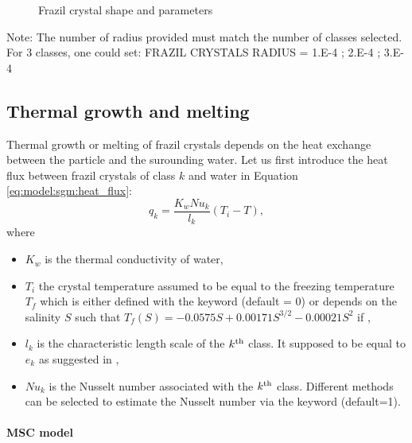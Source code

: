 \begin{figure}[H]
    \begin{center}
    \end{center}
    \caption{Frazil crystal shape and parameters}
    \label{fig:crystal_shape}
\end{figure}

\begin{WarningBlock}{Note:}
 The number of radius provided must match the number of classes selected. For 3 classes, one could set:
 FRAZIL CRYSTALS RADIUS = 1.E-4 ; 2.E-4 ; 3.E-4
\end{WarningBlock}

\subsection{Thermal growth and melting}
\label{section:thermal_growth}

Thermal growth or melting of frazil crystals depends on the heat exchange between the particle and the surounding water.
Let us first introduce the heat flux between frazil crystals of class $k$ and water in Equation \eqref{eq:model:sgm:heat_flux}:
\begin{equation}
q_k = \dfrac{K_w Nu_k}{l_k} (T_i - T),
\label{eq:model:sgm:heat_flux}
\end{equation}
where
\begin{itemize}
	\item $K_w$ is the thermal conductivity of water,
	\item $T_i$ the crystal temperature assumed to be equal to the freezing temperature $T_f$ which
is either defined with the keyword  (default = 0) or
depends on the salinity $S$ such that $T_f(S) = -0.0575S + 0.00171S^{3/2} - 0.00021S^2$ if ,
    \item $l_k$ is the characteristic length scale of the $k^{\rm{th}}$ class. It supposed to be equal to $e_k$ as suggested in \cite{jones_wells_2018},
    \item $Nu_k$ is the Nusselt number associated with the $k^{\rm{th}}$ class. Different methods can be selected to estimate the Nusselt number via the keyword  (default=1).
\end{itemize}


\paragraph{MSC model}


